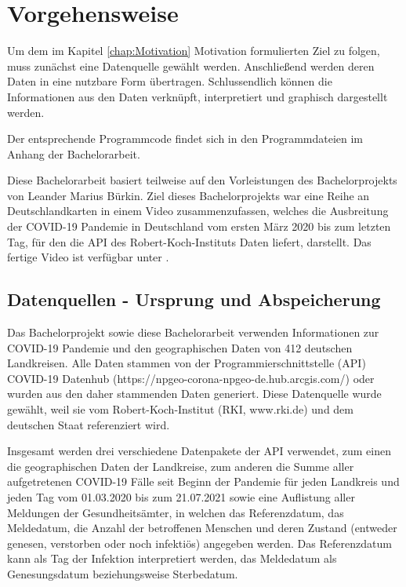\chapter{Vorgehensweise}\label{chap:Vorgehensweise}
Um dem im Kapitel \glqq{}\ref{chap:Motivation} Motivation\grqq{} formulierten Ziel zu folgen, muss zunächst eine Datenquelle gewählt werden.
Anschließend werden deren Daten in eine nutzbare Form übertragen.
Schlussendlich können die Informationen aus den Daten verknüpft, interpretiert und graphisch dargestellt werden.

Der entsprechende Programmcode findet sich in den Programmdateien im Anhang der Bachelorarbeit. 

Diese Bachelorarbeit basiert teilweise auf den Vorleistungen des Bachelorprojekts von Leander Marius Bürkin.
Ziel dieses Bachelorprojekts war eine Reihe an Deutschlandkarten in einem Video zusammenzufassen, welches die Ausbreitung der COVID-19 Pandemie in Deutschland vom ersten März 2020 bis zum letzten Tag, für den die API des Robert-Koch-Instituts Daten liefert, darstellt.
Das fertige Video ist verfügbar unter .

\section{Datenquellen - Ursprung und Abspeicherung}\label{sec:Datenquelle}

Das Bachelorprojekt sowie diese Bachelorarbeit verwenden Informationen zur COVID-19 Pandemie und den geographischen Daten von 412 deutschen Landkreisen. Alle Daten stammen von der Programmierschnittstelle (API) \glqq{}COVID-19 Datenhub\grqq{}
(https://npgeo-corona-npgeo-de.hub.arcgis.com/) oder wurden aus den daher stammenden Daten generiert. Diese Datenquelle wurde gewählt, weil sie vom Robert-Koch-Institut (RKI, www.rki.de) und dem deutschen Staat referenziert wird.



Insgesamt werden drei verschiedene Datenpakete der API verwendet, zum einen die geographischen Daten der Landkreise, zum anderen die Summe aller aufgetretenen COVID-19 Fälle seit Beginn der Pandemie für jeden Landkreis und jeden Tag vom 01.03.2020 bis zum 21.07.2021 sowie eine Auflistung aller Meldungen der Gesundheitsämter, in welchen das  Referenzdatum, das Meldedatum, die Anzahl der betroffenen Menschen und deren Zustand (entweder genesen, verstorben oder noch infektiös) angegeben werden. Das Referenzdatum kann als Tag der Infektion interpretiert werden, das Meldedatum als Genesungsdatum beziehungsweise Sterbedatum.

